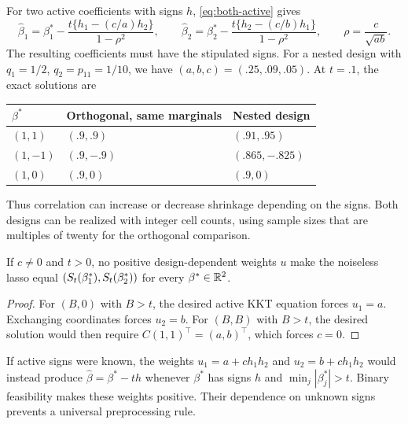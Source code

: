 For two active coefficients with signs $h$, \eqref{eq:both-active} gives
\begin{equation}
 \label{eq:binary-shrinkage}
 \hat\beta_1 = \beta_1^*
               - \frac{t\{h_1 - (c/a)h_2\}}{1 - \rho^2},\qquad \hat\beta_2
             = \beta_2^* - \frac{t\{h_2 - (c/b)h_1\}}{1 - \rho^2},\qquad \rho
             = \frac{c}{\sqrt{ab}}.
\end{equation}
The resulting coefficients must have the stipulated signs. For a nested design
with $q_1 = 1/2$, $q_2 = p_{11} = 1/10$, we have $(a,b,c) = (.25,.09,.05)$. At
$t = .1$, the exact solutions are
\begin{center}
 \begin{tabular}{lll}
  \toprule
  $\beta^*$ & Orthogonal, same marginals & Nested design  \\
  \midrule
  $(1,1)$   & $(.9,.9)$                  & $(.91,.95)$    \\
  $(1,-1)$  & $(.9,-.9)$                 & $(.865,-.825)$ \\
  $(1,0)$   & $(.9,0)$                   & $(.9,0)$       \\
  \bottomrule
 \end{tabular}
\end{center}
Thus correlation can increase or decrease shrinkage depending on the signs. Both
designs can be realized with integer cell counts, using sample sizes that are
multiples of twenty for the orthogonal comparison.

\begin{proposition}
 \label{prop:no-diagonal}
 If $c \ne 0$ and $t > 0$, no positive design-dependent weights $u$ make the
 noiseless lasso equal $(S_t(\beta_1^*),S_t(\beta_2^*))$ for every
 $\beta^* \in \mathbb{R}^2$.
\end{proposition}
\begin{proof}
 For $(B,0)$ with $B > t$, the desired active KKT equation forces $u_1 = a$.
 Exchanging coordinates forces $u_2 = b$. For $(B,B)$ with $B > t$, the desired
 solution would then require $C(1,1)^\top = (a,b)^\top$, which forces $c = 0$.
\end{proof}
If active signs were known, the weights $u_1 = a + ch_1h_2$ and
$u_2 = b + ch_1h_2$ would instead produce $\hat\beta = \beta^* - th$ whenever
$\beta^*$ has signs $h$ and $\min_j|\beta_j^*| > t$. Binary feasibility makes
these weights positive. Their dependence on unknown signs prevents a universal
preprocessing rule.

